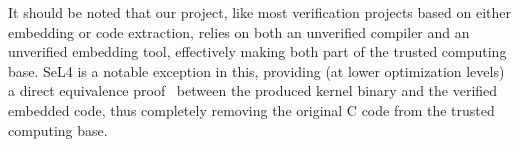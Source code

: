 It should be noted that our project, like most verification projects based on
either embedding or code extraction, relies on both
an unverified compiler and an unverified embedding tool, effectively making both
part of the trusted computing base. SeL4 is a notable exception in this,
providing (at lower optimization levels) a direct equivalence proof~\cite{sewell2013translation} between the
produced kernel binary and the verified embedded code, thus completely removing
the original C code from the trusted computing base.
